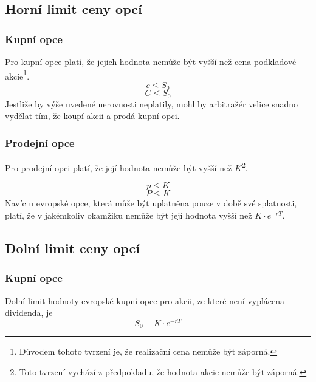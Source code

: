 \documentclass[a4paper]{book}
\begin{document}
\subsection{Horní limit ceny opcí}

\subsubsection{Kupní opce}

Pro kupní opce platí, že jejich hodnota nemůže být vyšší než cena podkladové akcie\footnote{Důvodem tohoto tvrzení je, že realizační cena nemůže být záporná.}.
\begin{equation*}
c \le S_0
\end{equation*}
\begin{equation*}
C \le S_0
\end{equation*}
Jestliže by výše uvedené nerovnosti neplatily, mohl by arbitražér velice snadno vydělat tím, že koupí akcii a prodá kupní opci.\\

\subsubsection{Prodejní opce}

Pro prodejní opci platí, že její hodnota nemůže být vyšší než $K$\footnote{Toto tvrzení vychází z předpokladu, že hodnota akcie nemůže být záporná.}.

\begin{equation*}
p \le K
\end{equation*}
\begin{equation*}
P \le K
\end{equation*}
Navíc u evropské opce, která může být uplatněna pouze v době své splatnosti, platí, že v jakémkoliv okamžiku nemůže být její hodnota vyšší než $K \cdot e^{-rT}$.

\subsection{Dolní limit ceny opcí}

\subsubsection{Kupní opce}

Dolní limit hodnoty evropské kupní opce pro akcii, ze které není vyplácena dividenda, je
\begin{equation*}
S_0 - K \cdot e^{-rT}
\end{equation*}
\end{document}
